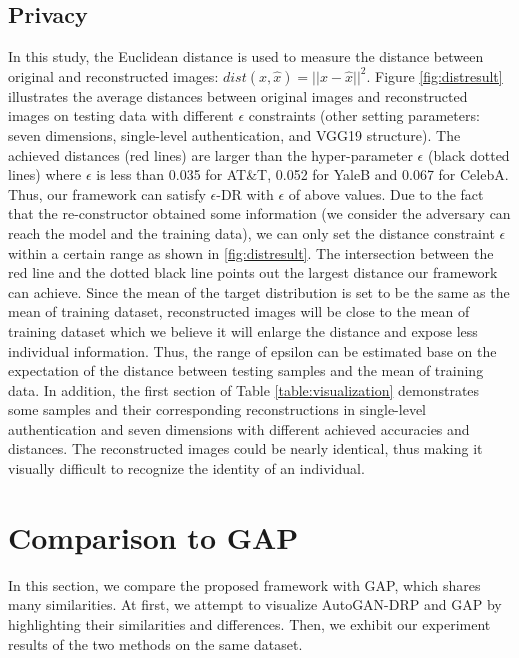 \subsection{Privacy}
In this study, the Euclidean distance is used to measure the distance between original and reconstructed images: $dist(x,\hat{x}) = ||x-\hat{x}||^2$. Figure \ref{fig:distresult} illustrates the average distances between original images and reconstructed images on testing data with different $\epsilon$ constraints (other setting parameters: seven dimensions, single-level authentication, and VGG19 structure). The achieved distances (red lines) are larger than the hyper-parameter $\epsilon$ (black dotted lines) where $\epsilon$ is less than 0.035 for AT\&T, 0.052 for YaleB and 0.067 for CelebA. Thus, our framework can satisfy $\epsilon$-DR with $\epsilon$ of above values. Due to the fact that the re-constructor obtained some information (we consider the adversary can reach the model and the training data), we can only set the distance constraint $\epsilon$ within a certain range as shown in \ref{fig:distresult}. The intersection between the red line and the dotted black line points out the largest distance our framework can achieve. Since the mean of the target distribution is set to be the same as the mean of training dataset, reconstructed images will be close to the mean of training dataset which we believe it will enlarge the distance and expose less individual information. Thus, the range of epsilon can be estimated base on the expectation of the distance between testing samples and the mean of training data. In addition, the first section of Table \ref{table:visualization} demonstrates some samples and their corresponding reconstructions in single-level authentication and seven dimensions with different achieved accuracies and distances. The reconstructed images could be nearly identical, thus making it visually difficult to recognize the identity of an individual.      

\section{Comparison to GAP\cite{GAP}}
\label{sec:AutoGAN_GAP}

In this section, we compare the proposed framework with GAP, which shares many similarities. At first, we attempt to visualize AutoGAN-DRP and GAP by highlighting their similarities and differences. Then, we exhibit our experiment results of the two methods on the same dataset. 

